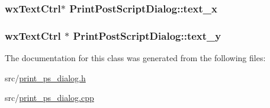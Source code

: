 \hypertarget{a00117_a6c7b6ae5afe5a6112d6febf81e010349}{
\subsubsection[{text\-\_\-x}]{\setlength{\rightskip}{0pt plus 5cm}wx\-Text\-Ctrl$\ast$ Print\-Post\-Script\-Dialog\-::text\-\_\-x\hspace{0.3cm}{\ttfamily [private]}}}\label{a00117_a6c7b6ae5afe5a6112d6febf81e010349}
\hypertarget{a00117_ac06da96a4a86a1ae63c767ab5545e96b}{
\subsubsection[{text\-\_\-y}]{\setlength{\rightskip}{0pt plus 5cm}wx\-Text\-Ctrl $\ast$ Print\-Post\-Script\-Dialog\-::text\-\_\-y\hspace{0.3cm}{\ttfamily [private]}}}\label{a00117_ac06da96a4a86a1ae63c767ab5545e96b}


The documentation for this class was generated from the following files\-:\begin{DoxyCompactItemize}
\item 
src/\hyperlink{a00241}{print\-\_\-ps\-\_\-dialog.\-h}\item 
src/\hyperlink{a00240}{print\-\_\-ps\-\_\-dialog.\-cpp}\end{DoxyCompactItemize}
